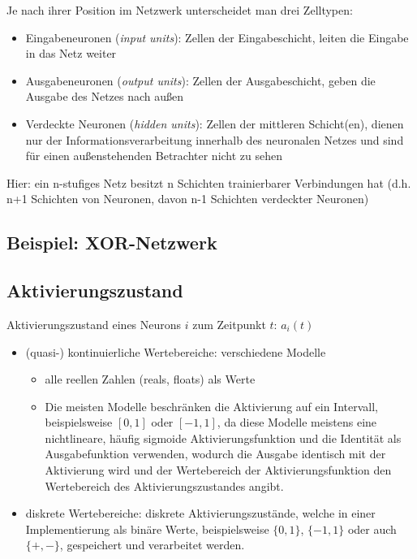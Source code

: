 \noindent
Je nach ihrer Position im Netzwerk unterscheidet man drei Zelltypen:
\begin{itemize}[noitemsep]
\item Eingabeneuronen (\textit{input units}): Zellen der Eingabeschicht, leiten die Eingabe in das Netz weiter
\item Ausgabeneuronen (\textit{output units}): Zellen der Ausgabeschicht, geben die Ausgabe des Netzes nach außen
\item Verdeckte Neuronen (\textit{hidden units}): Zellen der mittleren Schicht(en), dienen nur der Informationsverarbeitung innerhalb des neuronalen Netzes und sind für einen
außenstehenden Betrachter nicht zu sehen
\end{itemize}

Hier: ein n-stufiges Netz besitzt n Schichten trainierbarer Verbindungen hat (d.h. n+1 Schichten von Neuronen, davon n-1 Schichten verdeckter Neuronen)

\subsection{Beispiel: XOR-Netzwerk}
\subsection{Aktivierungszustand}
Aktivierungszustand eines Neurons $i$ zum Zeitpunkt $t$: $a_i(t)$ 
\begin{itemize}
\item (quasi-) kontinuierliche Wertebereiche: verschiedene Modelle 
\begin{itemize}
\item alle reellen Zahlen (reals, floats) als Werte
\item Die meisten Modelle beschränken die Aktivierung auf ein
Intervall, beispielsweise $[0, 1]$ oder $[-1, 1]$, da diese Modelle
meistens eine nichtlineare, häufig sigmoide Aktivierungsfunktion und die Identität
als Ausgabefunktion verwenden, wodurch die Ausgabe identisch mit der
Aktivierung wird und der Wertebereich der Aktivierungsfunktion den Wertebereich
des Aktivierungszustandes angibt.
\end{itemize}
\item diskrete Wertebereiche: diskrete Aktivierungszustände, welche in einer Implementierung als binäre Werte, beispielsweise $\{0, 1\}$, $\{-1, 1\}$ oder auch $\{+, -\}$, gespeichert und verarbeitet werden.
\end{itemize}

